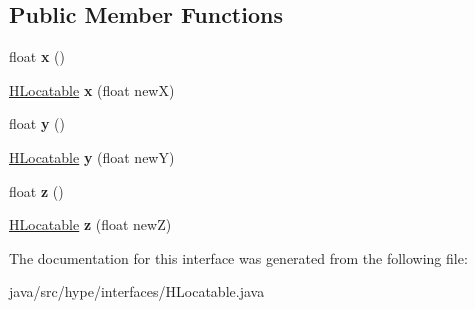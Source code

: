 \subsection*{Public Member Functions}
\begin{DoxyCompactItemize}
\item 
\hypertarget{interfacehype_1_1interfaces_1_1_h_locatable_a4cded539ff26919e3549d0c20b485d59}{float {\bfseries x} ()}\label{interfacehype_1_1interfaces_1_1_h_locatable_a4cded539ff26919e3549d0c20b485d59}

\item 
\hypertarget{interfacehype_1_1interfaces_1_1_h_locatable_aa82e61c898f42d08e057154987d71b2c}{\hyperlink{interfacehype_1_1interfaces_1_1_h_locatable}{H\-Locatable} {\bfseries x} (float new\-X)}\label{interfacehype_1_1interfaces_1_1_h_locatable_aa82e61c898f42d08e057154987d71b2c}

\item 
\hypertarget{interfacehype_1_1interfaces_1_1_h_locatable_a6e166a2021677c992c2a1cbd66b27418}{float {\bfseries y} ()}\label{interfacehype_1_1interfaces_1_1_h_locatable_a6e166a2021677c992c2a1cbd66b27418}

\item 
\hypertarget{interfacehype_1_1interfaces_1_1_h_locatable_a1af2c3ed77da91cc48b939c8e3bdaf83}{\hyperlink{interfacehype_1_1interfaces_1_1_h_locatable}{H\-Locatable} {\bfseries y} (float new\-Y)}\label{interfacehype_1_1interfaces_1_1_h_locatable_a1af2c3ed77da91cc48b939c8e3bdaf83}

\item 
\hypertarget{interfacehype_1_1interfaces_1_1_h_locatable_a535ac198558b7bc4ad45aa906c93302a}{float {\bfseries z} ()}\label{interfacehype_1_1interfaces_1_1_h_locatable_a535ac198558b7bc4ad45aa906c93302a}

\item 
\hypertarget{interfacehype_1_1interfaces_1_1_h_locatable_aa564f23ecbac52a2fe20e4ff47ddef05}{\hyperlink{interfacehype_1_1interfaces_1_1_h_locatable}{H\-Locatable} {\bfseries z} (float new\-Z)}\label{interfacehype_1_1interfaces_1_1_h_locatable_aa564f23ecbac52a2fe20e4ff47ddef05}

\end{DoxyCompactItemize}


The documentation for this interface was generated from the following file\-:\begin{DoxyCompactItemize}
\item 
java/src/hype/interfaces/H\-Locatable.\-java\end{DoxyCompactItemize}

